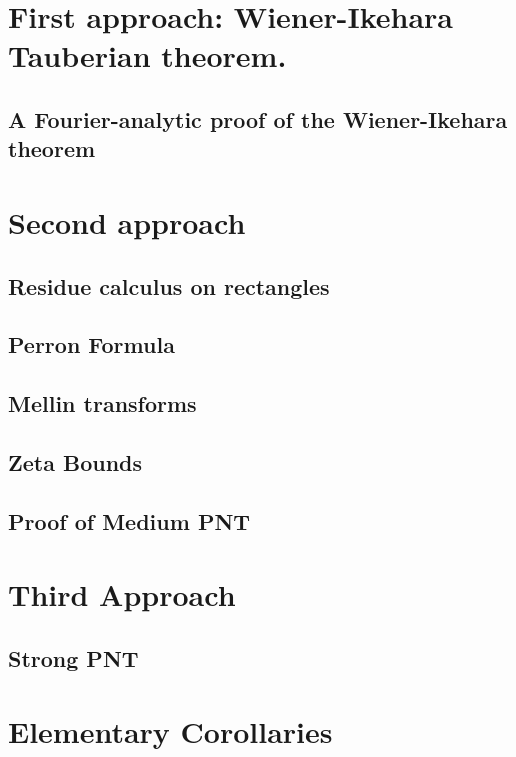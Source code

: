 \chapter{First approach: Wiener-Ikehara Tauberian theorem.}

\section{A Fourier-analytic proof of the Wiener-Ikehara theorem}



\chapter{Second approach}

\section{Residue calculus on rectangles}



\section{Perron Formula}


\section{Mellin transforms}



\section{Zeta Bounds}


\section{Proof of Medium PNT}



\chapter{Third Approach}

%

%

\section{Strong PNT}




\chapter{Elementary Corollaries}





